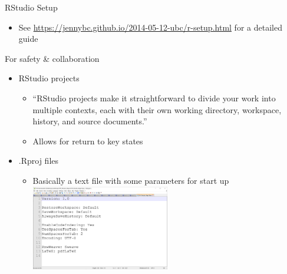 \documentclass[
  ignorenonframetext,
]{beamer}
\providecommand{\tightlist}{%
  \setlength{\itemsep}{0pt}\setlength{\parskip}{0pt}}
\begin{document}
\begin{frame}{RStudio Setup}
\protect\hypertarget{rstudio-setup-1}{}

\begin{itemize}
\tightlist
\item
  See \url{https://jennybc.github.io/2014-05-12-ubc/r-setup.html} for a
  detailed guide
\end{itemize}

\end{frame}

\begin{frame}{For safety \& collaboration}
\protect\hypertarget{for-safety-collaboration}{}

\begin{itemize}
\tightlist
\item
  RStudio projects

  \begin{itemize}
  \tightlist
  \item
    ``RStudio projects make it straightforward to divide your work into
    multiple contexts, each with their own working directory, workspace,
    history, and source documents.''
  \item
    Allows for return to key states
  \end{itemize}
\item
  .Rproj files

  \begin{itemize}
  \tightlist
  \item
    Basically a text file with some parameters for start up
    \includegraphics[width=0.5\textwidth,height=\textheight]{../external/images/Rproj_inside.PNG}
  \end{itemize}
\end{itemize}

\end{frame}
\end{document}
